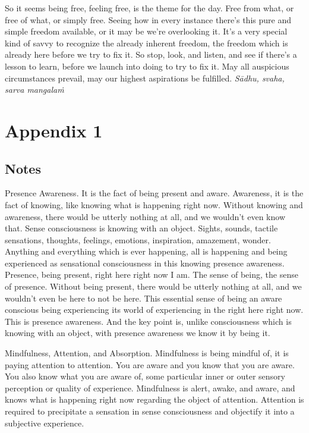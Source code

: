 \documentclass[12pt,openany]{book}
\begin{document}
So it seems being free, feeling free, is the theme for the day. Free from what, or free of what, or simply free. Seeing how in every instance there's this pure and simple freedom available, or it may be we're overlooking it. It's a very special kind of savvy to recognize the already inherent freedom, the freedom which is already here before we try to fix it. So stop, look, and listen, and see if there's a lesson to learn, before we launch into doing to try to fix it. May all auspicious circumstances prevail, may our highest aspirations be fulfilled. \textit{Sādhu, svaha, sarva mangalaṁ}

\chapter*{Appendix 1}
\section*{\centering Notes}

Presence Awareness. It is the fact of being present and aware. \linebreak Awareness, it is the fact of knowing, like knowing what is happening right now. Without knowing and awareness, there would be utterly nothing at all, and we wouldn't even know that. Sense consciousness is knowing with an object. Sights, sounds, tactile sensations, thoughts, feelings, emotions, inspiration, amazement, wonder. Anything and everything which is ever happening, all is happening and being experienced as sensational consciousness in this knowing presence awareness. Presence, being present, \linebreak right here right now I am. The sense of being, the sense of presence. Without being present, there would be utterly nothing at all, and we wouldn't even be here to not be here. This essential sense of being an aware conscious being experiencing its world of experiencing in the right here right now. This is presence awareness. And the key point is, unlike consciousness which is knowing with an object, with presence awareness we know it by being it.

Mindfulness, Attention, and Absorption. Mindfulness is being mindful of, it is paying attention to attention. You are aware and you know that you are aware. You also know what you are aware of, some particular inner or outer sensory perception or quality of experience. Mindfulness is alert, awake, and aware, and knows what is happening right now regarding the object of attention. Attention is required to precipitate a sensation in sense consciousness and objectify it into a subjective experience.
\end{document}

